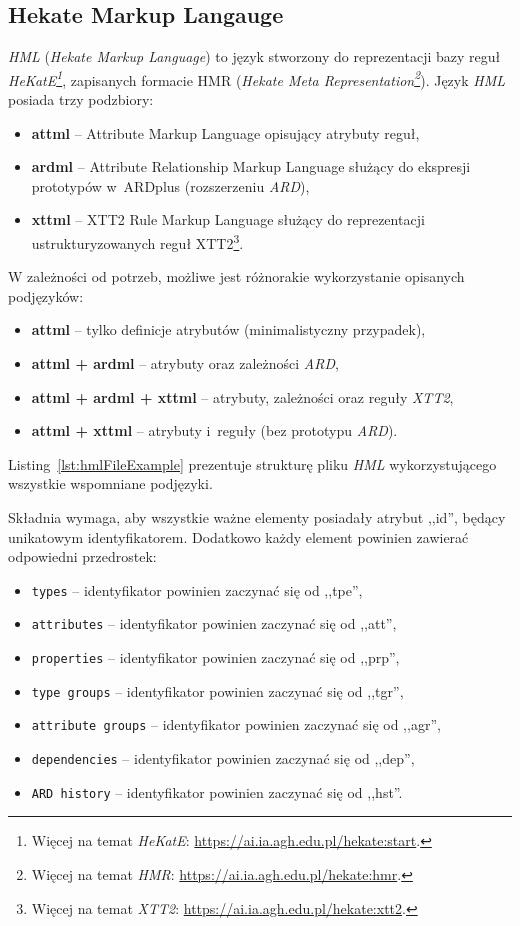 \subsection{Hekate Markup Langauge}
\label{sec:hml}
\emph{HML} (\emph{Hekate Markup Language}) to język stworzony do reprezentacji bazy reguł \emph{HeKatE\footnote{Więcej na temat \emph{HeKatE}: \url{https://ai.ia.agh.edu.pl/hekate:start}.}}, zapisanych formacie HMR (\emph{Hekate Meta Representation\footnote{Więcej na temat \emph{HMR}: \url{https://ai.ia.agh.edu.pl/hekate:hmr}.}}). Język \emph{HML} posiada trzy podzbiory:
\begin{itemize}
    \item \textbf{attml} -- Attribute Markup Language opisujący atrybuty reguł,
    \item \textbf{ardml} -- Attribute Relationship Markup Language służący do ekspresji prototypów w~ARDplus (rozszerzeniu \emph{ARD}),
    \item \textbf{xttml} -- XTT2 Rule Markup Language służący do reprezentacji ustrukturyzowanych reguł XTT2\footnote{Więcej na temat \emph{XTT2}: \url{https://ai.ia.agh.edu.pl/hekate:xtt2}.}.
\end{itemize}
W zależności od potrzeb, możliwe jest różnorakie wykorzystanie opisanych podjęzyków:
\begin{itemize}
    \item \textbf{attml} -- tylko definicje atrybutów (minimalistyczny przypadek),
    \item \textbf{attml + ardml} -- atrybuty oraz zależności \emph{ARD}, 
    \item \textbf{attml + ardml + xttml} -- atrybuty, zależności oraz reguły \emph{XTT2},
    \item \textbf{attml + xttml} -- atrybuty i~reguły (bez prototypu \emph{ARD}).
\end{itemize}\newpage
Listing~\ref{lst:hmlFileExample} prezentuje strukturę pliku \emph{HML} wykorzystującego wszystkie wspomniane podjęzyki. 


Składnia wymaga, aby wszystkie ważne elementy posiadały atrybut ,,id'', będący unikatowym identyfikatorem. Dodatkowo każdy element powinien zawierać odpowiedni przedrostek:
\begin{itemize}
    \item \texttt{types} -- identyfikator powinien zaczynać się od ,,tpe'',
    \item \texttt{attributes} -- identyfikator powinien zaczynać się od ,,att'',
    \item \texttt{properties} -- identyfikator powinien zaczynać się od ,,prp'',
    \item \texttt{type groups} -- identyfikator powinien zaczynać się od ,,tgr'',
    \item \texttt{attribute groups} -- identyfikator powinien zaczynać się od ,,agr'',
    \item \texttt{dependencies} -- identyfikator powinien zaczynać się od ,,dep'',
    \item \texttt{ARD history} -- identyfikator powinien zaczynać się od ,,hst''.
\end{itemize}

